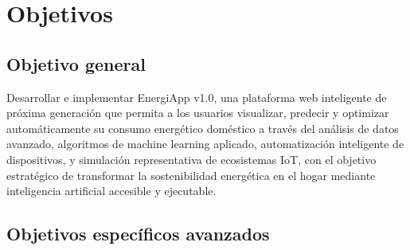 \section{Objetivos}

\subsection{Objetivo general}

Desarrollar e implementar EnergiApp v1.0, una plataforma web inteligente de próxima generación que permita a los usuarios visualizar, predecir y optimizar automáticamente su consumo energético doméstico a través del análisis de datos avanzado, algoritmos de machine learning aplicado, automatización inteligente de dispositivos, y simulación representativa de ecosistemas IoT, con el objetivo estratégico de transformar la sostenibilidad energética en el hogar mediante inteligencia artificial accesible y ejecutable.

\subsection{Objetivos específicos avanzados}


